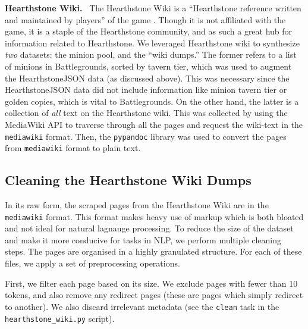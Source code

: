 \documentclass{paper}
\newcommand{\inlineSection}[1]{\vspace{0.5em}\noindent\textbf{#1.}~}
\begin{document}
\inlineSection{Hearthstone Wiki} The Hearthstone Wiki is a ``Hearthstone reference written and maintained by players'' of the game \cite{battlegrounds2019}. Though it is not affiliated with the game, it is a staple of the Hearthstone community, and as such a great hub for information related to Hearthstone. We leveraged Hearthstone wiki to synthesize \textit{two} datasets: the minion pool, and the ``wiki dumps.'' The former refers to a list of minions in Battlegrounds, sorted by tavern tier, which was used to augment the HearthstoneJSON data (as discussed above). This was necessary since the HearthstoneJSON data did not include information like minion tavern tier or golden copies, which is vital to Battlegrounds. On the other hand, the latter is a collection of \textit{all} text on the Hearthstone wiki. This was collected by using the MediaWiki API to traverse through all the pages and request the wiki-text in the \texttt{mediawiki} format. Then, the \texttt{pypandoc} library was used to convert the pages from \texttt{mediawiki} format to plain text.

\subsection{Cleaning the Hearthstone Wiki Dumps}
\label{sec:data_cleaning}

In its raw form, the scraped pages from the  Hearthstone Wiki are in the \texttt{mediawiki} format. This format makes heavy use of markup which is both bloated and not ideal for natural lagnauge processing. To reduce the size of the dataset and make it more conducive for tasks in NLP, we perform multiple cleaning steps. The pages are organised in a highly granulated structure. For each of these files, we apply a set of preprocessing operations.

First, we filter each page based on its size. We exclude pages with fewer than 10 tokens, and also remove any redirect pages (these are pages which simply redirect to another). We also discard irrelevant metadata (see the \texttt{clean} task in the \texttt{hearthstone\_wiki.py} script). 
\end{document}
